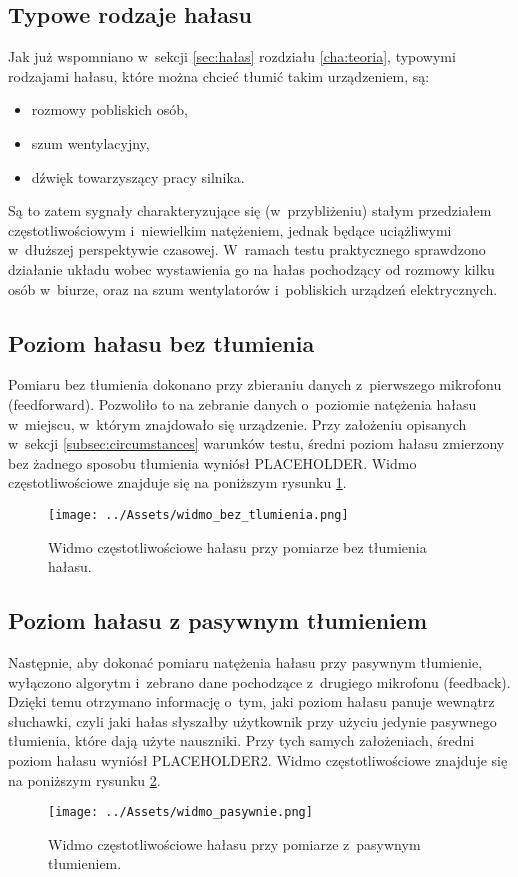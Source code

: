 \subsection{Typowe rodzaje hałasu}
Jak już wspomniano w~sekcji \ref{sec:hałas} rozdziału \ref{cha:teoria}, typowymi rodzajami hałasu, które można chcieć tłumić takim urządzeniem, są:
\begin{itemize}
	\item rozmowy pobliskich osób,
	\item szum wentylacyjny,
	\item dźwięk towarzyszący pracy silnika.
\end{itemize}
Są to zatem sygnały charakteryzujące się (w~przybliżeniu) stałym przedziałem częstotliwościowym i~niewielkim natężeniem, jednak będące uciążliwymi w~dłuższej perspektywie czasowej. W~ramach testu praktycznego sprawdzono działanie układu wobec wystawienia go na hałas pochodzący od rozmowy kilku osób w~biurze, oraz na szum wentylatorów i~pobliskich urządzeń elektrycznych.
\subsection{Poziom hałasu bez tłumienia}
Pomiaru bez tłumienia dokonano przy zbieraniu danych z~pierwszego mikrofonu (feedforward). Pozwoliło to na zebranie danych o~poziomie natężenia hałasu w~miejscu, w~którym znajdowało się urządzenie. Przy założeniu opisanych w~sekcji \ref{subsec:circumstances} warunków testu, średni poziom hałasu zmierzony bez żadnego sposobu tłumienia wyniósł PLACEHOLDER. %
Widmo częstotliwościowe znajduje się na poniższym rysunku \ref{fig:widmo_bez}.
\begin{figure}[h!]
	\texttt{[image: ../Assets/widmo\_bez\_tlumienia.png]}	
	\caption{Widmo częstotliwościowe hałasu przy pomiarze bez tłumienia hałasu.}
	\label{fig:widmo_bez}
\end{figure}

\subsection{Poziom hałasu z pasywnym tłumieniem}
Następnie, aby dokonać pomiaru natężenia hałasu przy pasywnym tłumienie, wyłączono algorytm i~zebrano dane pochodzące z~drugiego mikrofonu (feedback). Dzięki temu otrzymano informację o~tym, jaki poziom hałasu panuje wewnątrz słuchawki, czyli jaki hałas słyszałby użytkownik przy użyciu jedynie pasywnego tłumienia, które dają użyte nauszniki. Przy tych samych założeniach, średni poziom hałasu wyniósł PLACEHOLDER2. %
Widmo częstotliwościowe znajduje się na poniższym rysunku \ref{fig:widmo_pasywnie}. 
\begin{figure}[h!]
	\texttt{[image: ../Assets/widmo\_pasywnie.png]}	
	\caption{Widmo częstotliwościowe hałasu przy pomiarze z~pasywnym tłumieniem.}
	\label{fig:widmo_pasywnie}
\end{figure}

